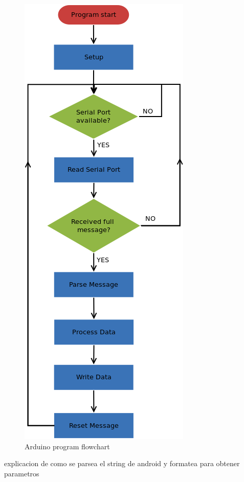 	\begin{figure}[H]
			\centering
			\includegraphics[scale=0.75]{images/Diagrams/arduino2.png}
			\caption{Arduino program flowchart }
			\label{arduinoFlowchart}
	\end{figure}
	\bigskip



	explicacion de como se parsea el string de android y formatea para obtener parametros
